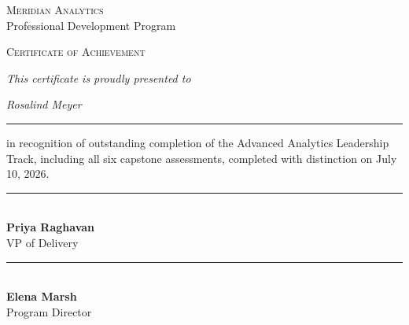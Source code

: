 \documentclass[11pt]{article}
\begin{document}
\begin{center}
  \vspace*{1.1cm}
  {\color{gold}\scshape\large Meridian Analytics}\\[4pt]
  {\color{inkgray}\small Professional Development Program}

  \vspace{1.0cm}
  {\fontsize{34}{40}\selectfont\color{navy}\scshape Certificate of Achievement}

  \vspace{0.8cm}
  {\color{inkgray}\itshape This certificate is proudly presented to}

  \vspace{0.55cm}
  {\fontsize{28}{34}\selectfont\itshape\color{gold} Rosalind Meyer}

  \vspace{0.25cm}
  {\color{gold}\rule{9cm}{0.8pt}}

  \vspace{0.6cm}
  \begin{minipage}{0.72\textwidth}
    \centering\color{inkgray}
    in recognition of outstanding completion of the Advanced Analytics
    Leadership Track, including all six capstone assessments, completed
    with distinction on July 10, 2026.
  \end{minipage}

  \vfill
  \begin{minipage}{0.36\textwidth}
    \centering
    {\color{navy}\rule{5.2cm}{0.6pt}}\\[4pt]
    {\small\bfseries\color{navy} Priya Raghavan}\\
    {\scriptsize\color{inkgray} VP of Delivery}
  \end{minipage}\hfill
  \begin{minipage}{0.2\textwidth}
    \centering
  \end{minipage}\hfill
  \begin{minipage}{0.36\textwidth}
    \centering
    {\color{navy}\rule{5.2cm}{0.6pt}}\\[4pt]
    {\small\bfseries\color{navy} Elena Marsh}\\
    {\scriptsize\color{inkgray} Program Director}
  \end{minipage}
  \vspace*{0.4cm}
\end{center}
\end{document}
